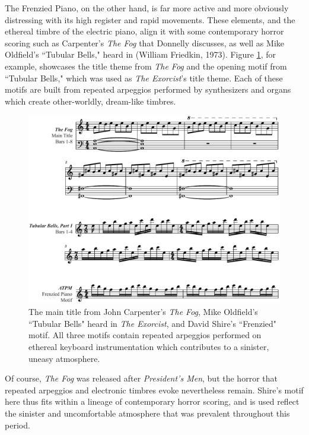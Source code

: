 The Frenzied Piano, on the other hand, is far more active and more obviously distressing with its high register and rapid movements.
These elements, and the ethereal timbre of the electric piano, align it with some contemporary horror scoring such as Carpenter's \textit{The Fog} that Donnelly discusses, as well as Mike Oldfield's ``Tubular Bells," heard in  (William Friedkin, 1973).
Figure \ref{fig:president-horror-synth}, for example, showcases the title theme from \textit{The Fog} and the opening motif from ``Tubular Bells," which was used as \textit{The Exorcist}'s title theme.
Each of these motifs are built from repeated arpeggios performed by synthesizers and organs which create other-worldly, dream-like timbres.\autocites[On``Tubular Bells," Mike Oldfield utilised pianos, and multiple reed and electronic organs. As Donnelly notes, there is no official record of which specific synthesizer Carpenter used on his score for \textit{The Fog}. Donnelly surmises that it was likely a Moog Series 3.][159-160]{donnelly_hearing_2010}

\begin{figure}
    \centering
    \includegraphics[width=1\linewidth]{img/president-horror-synth.pdf}
    \caption{The main title from John Carpenter's \textit{The Fog}, Mike Oldfield's ``Tubular Bells" heard in \textit{The Exorcist}, and David Shire's ``Frenzied" motif. All three motifs contain repeated arpeggios performed on ethereal keyboard instrumentation which contributes to a sinister, uneasy atmosphere.}
    \label{fig:president-horror-synth}
\end{figure}
Of course, \textit{The Fog} was released after \textit{President's Men}, but the horror that repeated arpeggios and electronic timbres evoke nevertheless remain.
Shire's motif here thus fits within a lineage of contemporary horror scoring, and is used reflect the sinister and uncomfortable atmosphere that was prevalent throughout this period.


